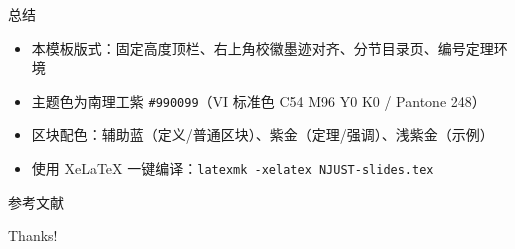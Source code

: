 \documentclass[10pt,aspectratio=169,hyperref={colorlinks,citecolor=njust_blue,urlcolor=njust_blue,linkcolor=}]{beamer}
\theoremstyle{plain}
\begin{document}
\begin{frame}{总结}
\begin{itemize}
    \item 本模板版式：固定高度顶栏、右上角校徽墨迹对齐、分节目录页、编号定理环境
    \item 主题色为南理工紫 \texttt{\#990099}（VI 标准色 C54 M96 Y0 K0 / Pantone 248）
    \item 区块配色：辅助蓝（定义/普通区块）、紫金（定理/强调）、浅紫金（示例）
    \item 使用 XeLaTeX 一键编译：\texttt{latexmk -xelatex NJUST-slides.tex}
\end{itemize}
\end{frame}

\begin{frame}{参考文献}
    \renewcommand*{\bibfont}{\footnotesize}
    
    
\end{frame}

\begin{frame}
    \begin{center}
        {\Huge\calligra Thanks!}
    \end{center}
\end{frame}
\end{document}
